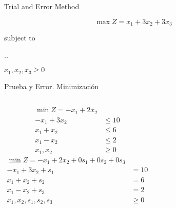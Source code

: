 \begin{frameExample}{Trial and Error Method \label{example:02.15-02}}{}

\[     \max Z = x_1 + 3x_2 + 3x_3\]

{\centering
  subject to

  \sysdelim..%

  \vspace{3mm}
  $x_1, x_2,x_3  \geq 0$
  \par}
\end{frameExample}

\begin{frameExample}{Prueba y Error. Minimización}{}
  \begin{columns}
   \begin{align*}
     \min Z = -x_1 + 2x_2 & \\[5mm]
     -x_1 + 3x_2 & \leq 10\\
     x_1 + x_2 & \leq 6\\
     x_1 - x_2 & \leq 2\\[5mm]
     x_1, x_2 & \geq 0
  \end{align*}
  \begin{align*}
     \min Z = -x_1 + 2x_2 + 0s_1 + 0s_2 + 0s_3 & \\[5mm]
     -x_1 + 3x_2 + s_1 & = 10\\
     x_1 + x_2 + s_2& = 6\\
     x_1 - x_2 + s_3& = 2\\[5mm]
     x_1, x_2, s_1, s_2, s_3 & \geq 0
  \end{align*}
  \end{columns}
\end{frameExample}

